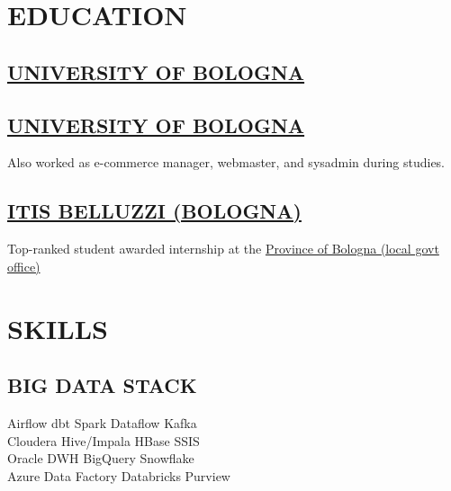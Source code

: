 \documentclass[]{deedy-resume-cv}
\begin{document}
\hfill
\begin{minipage}[t]{0.35\textwidth}

\section{EDUCATION}

\subsection{\href{https://www.unibo.it/}{UNIVERSITY OF BOLOGNA}}

\sectionsep
\subsection{\href{https://www.unibo.it/}{UNIVERSITY OF BOLOGNA}}
Also worked as e-commerce manager, webmaster, and sysadmin during studies.

\sectionsep
\subsection{\href{https://www.belluzzifioravanti.it/}{ITIS BELLUZZI (BOLOGNA)}}
Top-ranked student awarded internship at the \href{https://www.cittametropolitana.bo.it/}{Province of Bologna (local govt office)}

\section{SKILLS}

\subsection{BIG DATA STACK}
Airflow \textbullet{} dbt \textbullet{} Spark \textbullet{} Dataflow \textbullet{} Kafka \\
Cloudera Hive/Impala \textbullet{} HBase \textbullet{} SSIS \\
Oracle DWH \textbullet{} BigQuery \textbullet{} Snowflake \\
Azure Data Factory \textbullet{} Databricks \textbullet{} Purview


\end{minipage}
\end{document}
